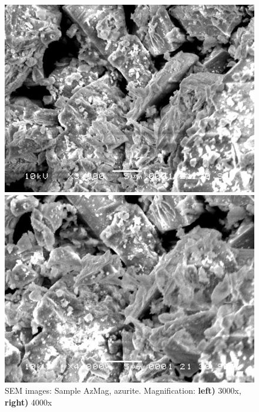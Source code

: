 \begin{figure}[H]
\centering
\begin{minipage}{.45\textwidth}
  \centering
  \includegraphics[width=\linewidth]{AzMag_x3000_1_160321}
\end{minipage}
\begin{minipage}{.45\textwidth}
  \centering
  \includegraphics[width=\linewidth]{AzMag_x4000_1_160321}
\end{minipage}
\caption[SEM images: Sample AzMag, azurite]{SEM images: Sample AzMag, azurite. Magnification: \textbf{left)} 3000x, \textbf{right)} 4000x}
\label{fig:azmag_sem_5}
\end{figure}


